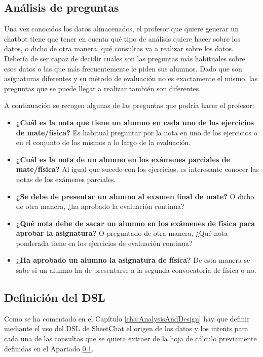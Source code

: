 \subsection{Análisis de preguntas}
\label{sec:queriesNotas}

Una vez conocidos los datos almacenados, el profesor que quiere generar un chatbot tiene que tener en cuenta qué tipo de análisis quiere hacer sobre los datos, o dicho de otra manera, qué consultas va a realizar sobre los datos. Debería de ser capaz de decidir cuales son las preguntas más habituales sobre esos datos o las que más frecuentemente le piden sus alumnos. Dado que son asignaturas diferentes y su método de evaluación no es exactamente el mismo, las preguntas que se puede llegar a realizar también son diferentes.

A continuación se recogen algunas de las preguntas que podría hacer el profesor:
\begin{itemize}
	\item \textbf{¿Cuál es la nota que tiene un alumno en cada uno de los ejercicios de mate/fisica?} Es habitual preguntar por la nota en uno de los ejercicios o en el conjunto de los mismos a lo largo de la evaluación.
	\item \textbf{¿Cuál es la nota de un alumno en los exámenes parciales de mate/física?} Al igual que sucede con los ejercicios, es interesante conocer las notas de los exámenes parciales.
	\item \textbf{¿Se debe de presentar un alumno al examen final de mate?} O dicho de otra manera, ¿ha aprobado la evaluación continua?
	\item \textbf{¿Qué nota debe de sacar un alumno en los exámenes de física para aprobar la asignatura?} O preguntado de otra manera, ¿Qué nota ponderada tiene en los ejercicios de evaluación continua?
	\item \textbf{¿Ha aprobado un alumno la asignatura de física?} De esta manera se sabe si un alumno ha de presentarse a la segunda convocatoria de física o no.
\end{itemize}

\subsection{Definición del DSL}

Como se ha comentado en el Capítulo \ref{cha:AnalysisAndDesign} hay que definir mediante el uso del DSL de SheetChat el origen de los datos y los intents para cada una de las consultas que se quiera extraer de la hoja de cálculo previamente definidas en el Apartado \ref{sec:queriesNotas}.

